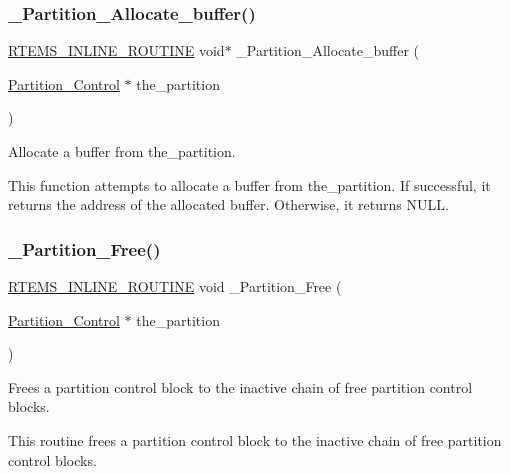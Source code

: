 \subsubsection{\texorpdfstring{\_Partition\_Allocate\_buffer()}{\_Partition\_Allocate\_buffer()}}
{\footnotesize\ttfamily \mbox{\hyperlink{group__RTEMSScoreBaseDefs_gac216239df231d5dbd15e3520b0b9313f}{R\+T\+E\+M\+S\+\_\+\+I\+N\+L\+I\+N\+E\+\_\+\+R\+O\+U\+T\+I\+NE}} void$\ast$ \+\_\+\+Partition\+\_\+\+Allocate\+\_\+buffer (\begin{DoxyParamCaption}\item[{\mbox{\hyperlink{structPartition__Control}{Partition\+\_\+\+Control}} $\ast$}]{the\+\_\+partition }\end{DoxyParamCaption})}



Allocate a buffer from the\+\_\+partition. 

This function attempts to allocate a buffer from the\+\_\+partition. If successful, it returns the address of the allocated buffer. Otherwise, it returns N\+U\+LL. \mbox{\label{group__ClassicPartImpl_ga40e5c822d71dc4b38c696d2061608c55}} 
\subsubsection{\texorpdfstring{\_Partition\_Free()}{\_Partition\_Free()}}
{\footnotesize\ttfamily \mbox{\hyperlink{group__RTEMSScoreBaseDefs_gac216239df231d5dbd15e3520b0b9313f}{R\+T\+E\+M\+S\+\_\+\+I\+N\+L\+I\+N\+E\+\_\+\+R\+O\+U\+T\+I\+NE}} void \+\_\+\+Partition\+\_\+\+Free (\begin{DoxyParamCaption}\item[{\mbox{\hyperlink{structPartition__Control}{Partition\+\_\+\+Control}} $\ast$}]{the\+\_\+partition }\end{DoxyParamCaption})}



Frees a partition control block to the inactive chain of free partition control blocks. 

This routine frees a partition control block to the inactive chain of free partition control blocks. \mbox{\label{group__ClassicPartImpl_gad98ad79ca7f14ebf7fb884590494964c}} 

